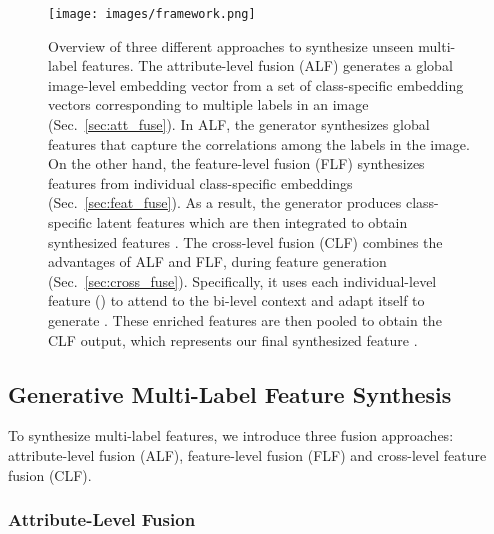 \documentclass[10pt,journal,compsoc]{IEEEtran}
\begin{document}
\begin{figure*}[t]
    \centering
    \texttt{[image: images/framework.png]}
    \caption{Overview of three different approaches to synthesize unseen multi-label features. The attribute-level fusion (ALF) generates a global image-level embedding vector from a set of class-specific embedding vectors corresponding to multiple labels in an image (Sec.~\ref{sec:att_fuse}). In ALF, the generator synthesizes global features  that capture the correlations among the labels in the image. On the other hand, the feature-level fusion (FLF) synthesizes features from individual class-specific embeddings (Sec.~\ref{sec:feat_fuse}). As a result, the generator produces class-specific latent features which are then integrated to obtain synthesized features . The cross-level fusion (CLF) combines the advantages of ALF and FLF, during feature generation (Sec.~\ref{sec:cross_fuse}). Specifically, it uses each individual-level feature () to attend to the bi-level context and adapt itself to generate . These enriched features are then pooled to obtain the CLF output, which represents our final synthesized feature .\vspace{-0.2cm} }
    \label{fig:caf_fuse}
\end{figure*}







\subsection{Generative Multi-Label Feature Synthesis}


To synthesize multi-label features, we introduce three fusion approaches: attribute-level fusion (ALF), feature-level fusion (FLF) and cross-level feature fusion (CLF). 
































\subsubsection{Attribute-Level Fusion\label{sec:att_fuse}}
\end{document}
